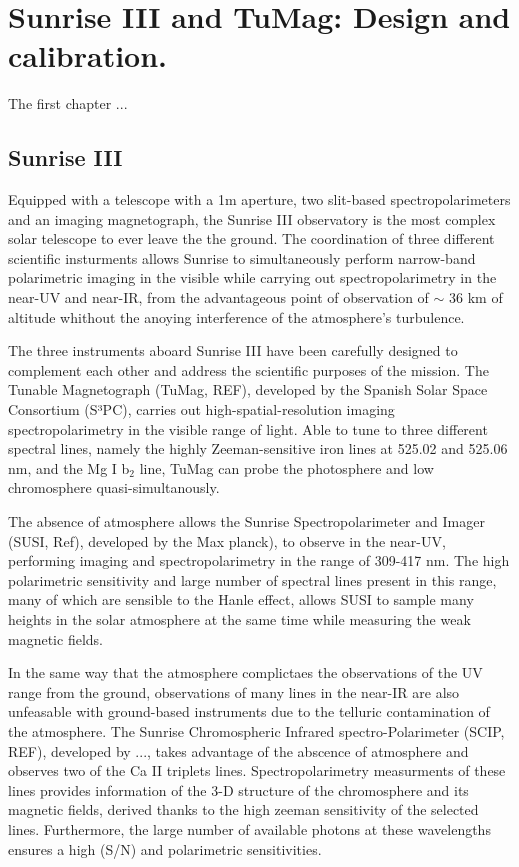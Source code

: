 \chapter{Sunrise III and TuMag: Design and calibration.}

The first chapter ...


\section{Sunrise III}

Equipped with a telescope with a 1m aperture, two slit-based spectropolarimeters and an imaging magnetograph, the Sunrise III observatory is the most complex solar telescope to ever leave the the ground. The coordination of three different scientific insturments allows Sunrise to simultaneously perform narrow-band polarimetric imaging in the visible while carrying out spectropolarimetry in the near-UV and near-IR, from the advantageous point of observation of $\sim$ 36 km of altitude whithout the anoying interference of the atmosphere's turbulence. 

The three instruments aboard Sunrise III have been carefully designed to complement each other and address the scientific purposes of the mission. The Tunable Magnetograph (TuMag, REF), developed by the Spanish Solar Space Consortium (S³PC), carries out high-spatial-resolution imaging spectropolarimetry in the visible range of light. Able to tune to three different spectral lines, namely the highly Zeeman-sensitive iron lines at 525.02 and 525.06 nm, and the Mg I b$_2$ line, TuMag can probe the photosphere and low chromosphere quasi-simultanously. 

The absence of atmosphere allows the Sunrise Spectropolarimeter and Imager (SUSI, Ref), developed by the Max planck), to observe in the near-UV, performing imaging and spectropolarimetry in the range of 309-417 nm. The high polarimetric sensitivity and large number of spectral lines present in this range, many of which are sensible to the Hanle effect, allows SUSI to sample many heights in the solar atmosphere at the same time while measuring the weak magnetic fields. 

In the same way that the atmosphere complictaes the observations of the UV range from the ground, observations of many lines in the near-IR are also unfeasable with ground-based instruments due to the telluric contamination of the atmosphere. The Sunrise Chromospheric Infrared spectro-Polarimeter (SCIP, REF), developed by ...,  takes advantage of the abscence of atmosphere and observes two of the Ca II triplets lines. Spectropolarimetry measurments of these lines provides information of the 3-D structure of the chromosphere and its magnetic fields, derived thanks to the high zeeman sensitivity of the selected lines. Furthermore, the large number of available photons at these wavelengths ensures a high (S/N) and polarimetric sensitivities. 


